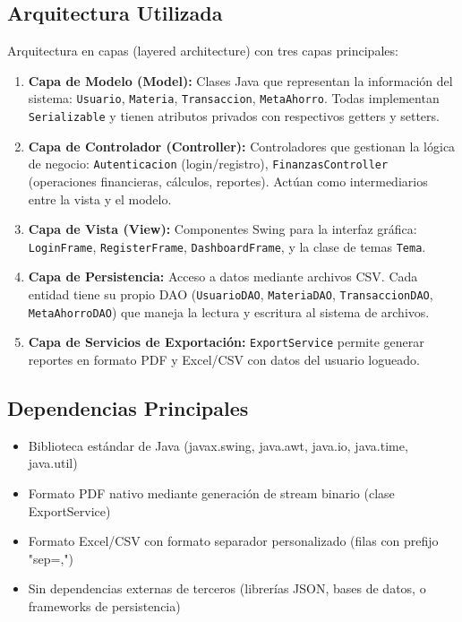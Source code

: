 \documentclass[utf8]{article}
\begin{document}
\subsection*{Arquitectura Utilizada}
Arquitectura en capas (layered architecture) con tres capas principales:
\begin{enumerate}[leftmargin=*, topsep=0pt, itemsep=0.5em]
    \item \textbf{Capa de Modelo (Model):} Clases Java que representan la información del sistema: \texttt{Usuario}, \texttt{Materia}, \texttt{Transaccion}, \texttt{MetaAhorro}. Todas implementan \texttt{Serializable} y tienen atributos privados con respectivos getters y setters.
    \item \textbf{Capa de Controlador (Controller):} Controladores que gestionan la lógica de negocio: \texttt{Autenticacion} (login/registro), \texttt{FinanzasController} (operaciones financieras, cálculos, reportes). Actúan como intermediarios entre la vista y el modelo.
    \item \textbf{Capa de Vista (View):} Componentes Swing para la interfaz gráfica: \texttt{LoginFrame}, \texttt{RegisterFrame}, \texttt{DashboardFrame}, y la clase de temas \texttt{Tema}.
    \item \textbf{Capa de Persistencia:} Acceso a datos mediante archivos CSV. Cada entidad tiene su propio DAO (\texttt{UsuarioDAO}, \texttt{MateriaDAO}, \texttt{TransaccionDAO}, \texttt{MetaAhorroDAO}) que maneja la lectura y escritura al sistema de archivos.
    \item \textbf{Capa de Servicios de Exportación:} \texttt{ExportService} permite generar reportes en formato PDF y Excel/CSV con datos del usuario logueado.
\end{enumerate}

\subsection*{Dependencias Principales}
\begin{itemize}[leftmargin=*]
    \item Biblioteca estándar de Java (javax.swing, java.awt, java.io, java.time, java.util)
    \item Formato PDF nativo mediante generación de stream binario (clase ExportService)
    \item Formato Excel/CSV con formato separador personalizado (filas con prefijo "sep=,")
    \item Sin dependencias externas de terceros (librerías JSON, bases de datos, o frameworks de persistencia)
\end{itemize}
\end{document}
